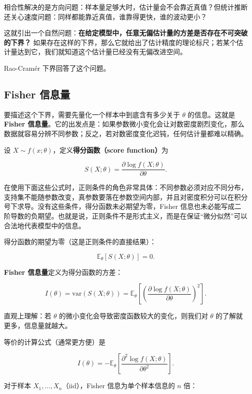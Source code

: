 相合性解决的是方向问题：样本量足够大时，估计量会不会靠近真值？但统计推断还关心速度问题：同样都能靠近真值，谁靠得更快，谁的波动更小？

这就引出一个自然问题：\textbf{在给定模型中，任意无偏估计量的方差是否存在不可突破的下界？} 如果存在这样的下界，那么它就给出了估计精度的理论标尺；若某个估计量达到它，我们就知道这个估计量已经没有无偏改进空间。

Rao-Cramér 下界回答了这个问题。

\subsection{Fisher 信息量}

要描述这个下界，需要先量化一个样本中到底含有多少关于 $\theta$ 的信息。这就是\textbf{Fisher 信息量}。它的出发点是：如果参数微小变化会让对数密度剧烈变化，那么数据就容易分辨不同参数；反之，若对数密度变化迟钝，任何估计量都难以精确。

设 $X \sim f(x;\theta)$，定义\textbf{得分函数（score function）}为

\[
S(X; \theta) = \frac{\partial \log f(X; \theta)}{\partial \theta}.
\label{eq:score-function}
\]

在使用下面这些公式时，正则条件的角色非常具体：不同参数必须对应不同分布，支持集不能随参数改变，真参数要落在参数空间内部，并且对密度积分可以在积分号下求导。没有这些条件，得分函数未必期望为零，Fisher 信息也未必能写成二阶导数的负期望。也就是说，正则条件不是形式主义，而是在保证``微分似然''可以合法地代表模型中的信息。

得分函数的期望为零（这是正则条件的直接结果）：

\[
\mathbb{E}_\theta[S(X; \theta)] = 0.
\label{eq:score-expectation-zero}
\]

\textbf{Fisher 信息量}定义为得分函数的方差：

\[
I(\theta) = \text{var}(S(X; \theta)) = \mathbb{E}_\theta\left[ \left( \frac{\partial \log f(X; \theta)}{\partial \theta} \right)^2 \right].
\label{eq:fisher-information}
\]

直观上理解：若 $\theta$ 的微小变化会导致密度函数较大的变化，则我们对 $\theta$ 的了解就更多，信息量就越大。

等价的计算公式（通常更方便）是

\[
I(\theta) = -\mathbb{E}_\theta\left[ \frac{\partial^2 \log f(X; \theta)}{\partial \theta^2} \right].
\label{eq:fisher-information-negative-hessian}
\]

对于样本 $X_1, \ldots, X_n$（iid），Fisher 信息为单个样本信息的 $n$ 倍：

